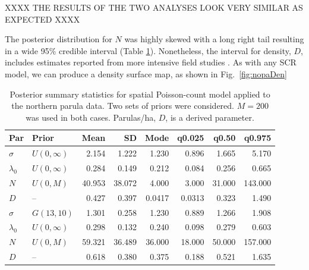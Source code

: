 XXXX THE RESULTS OF THE TWO ANALYSES LOOK VERY SIMILAR AS EXPECTED XXXX

The posterior distribution for
$N$ was highly skewed with a long right tail resulting in a wide 95\%
credible interval (Table \ref{t:nopaPosts}). Nonetheless, the interval
for density, $D$, includes estimates reported from more intensive field
studies \citep{moldenhaer_regelski:1996}. As with any SCR model,
we can produce a density surface map, as shown in Fig.~\ref{fig:nopaDen}




\begin{table}%
  \caption{Posterior summary statistics for spatial Poisson-count
    model applied to the northern parula data. Two sets of priors were
    considered. $M=200$ was used in both cases. Parulas/ha, $D$, is a
    derived parameter.}
  \scriptsize
  \begin{tabular}{l l rrrrrr}
    \hline
    Par        & Prior                  & Mean  & SD    & Mode   & q0.025  & q0.50  & q0.975  \\
    \hline
    $\sigma$   & $U(0, \infty)$   & 2.154   & 1.222  & 1.230   & 0.896   & 1.665   & 5.170    \\
    $\lambda_0$ & $U(0, \infty)$  & 0.284   & 0.149 & 0.212    & 0.084  & 0.256  & 0.665   \\
    $N$        & $U(0, M)$             & 40.953   & 38.072  & 4.000  & 3.000       & 31.000     & 143.000     \\
    $D$        &  --                   & 0.427    & 0.397 & 0.0417   & 0.0313  & 0.323  & 1.490    \\
    \hline
    $\sigma$    & $G(13, 10)$          & 1.301    & 0.258 & 1.230    & 0.889   & 1.266   & 1.908    \\
    $\lambda_0$ & $U(0, \infty)$ & 0.298    & 0.132 & 0.240    & 0.098   & 0.279  & 0.603   \\
    $N$         & $U(0, M)$            & 59.321   & 36.489  & 36.000 & 18.000      & 50.000     & 157.000     \\
    $D$         &  --                  & 0.618    & 0.380 & 0.375   & 0.188   & 0.521  & 1.635    \\
    \hline
  \end{tabular}
  \label{t:nopaPosts}
\end{table}


